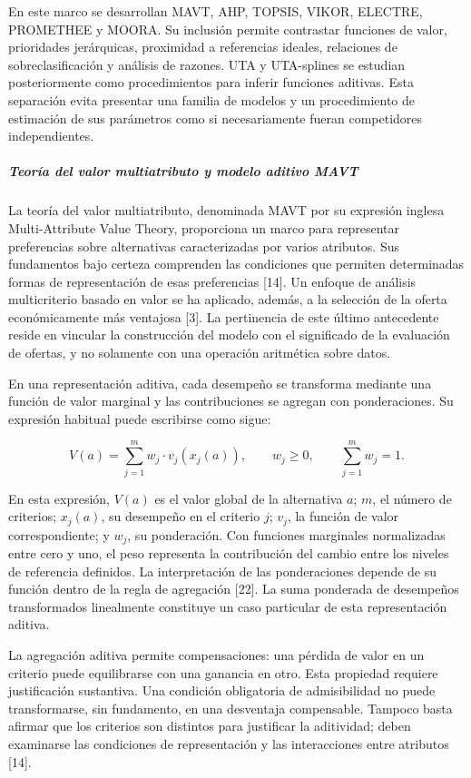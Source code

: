 \documentclass[12pt,a4paper]{article}
\begin{document}
En este marco se desarrollan MAVT, AHP, TOPSIS, VIKOR, ELECTRE, PROMETHEE y MOORA. Su inclusión permite contrastar funciones de valor, prioridades jerárquicas, proximidad a referencias ideales, relaciones de sobreclasificación y análisis de razones. UTA y UTA-splines se estudian posteriormente como procedimientos para inferir funciones aditivas. Esta separación evita presentar una familia de modelos y un procedimiento de estimación de sus parámetros como si necesariamente fueran competidores independientes.

\subparagraph{Teoría del valor multiatributo y modelo aditivo MAVT}

La teoría del valor multiatributo, denominada MAVT por su expresión inglesa Multi-Attribute Value Theory, proporciona un marco para representar preferencias sobre alternativas caracterizadas por varios atributos. Sus fundamentos bajo certeza comprenden las condiciones que permiten determinadas formas de representación de esas preferencias [14]. Un enfoque de análisis multicriterio basado en valor se ha aplicado, además, a la selección de la oferta económicamente más ventajosa [3]. La pertinencia de este último antecedente reside en vincular la construcción del modelo con el significado de la evaluación de ofertas, y no solamente con una operación aritmética sobre datos.

En una representación aditiva, cada desempeño se transforma mediante una función de valor marginal y las contribuciones se agregan con ponderaciones. Su expresión habitual puede escribirse como sigue:

\begin{equation}
V(a) = \sum_{j=1}^{m} w_j \cdot v_j(x_j(a)), \qquad w_j \geq 0, \qquad \sum_{j=1}^{m} w_j = 1.
\label{eq:mavt}
\end{equation}

En esta expresión, $V(a)$ es el valor global de la alternativa $a$; $m$, el número de criterios; $x_j(a)$, su desempeño en el criterio $j$; $v_j$, la función de valor correspondiente; y $w_j$, su ponderación. Con funciones marginales normalizadas entre cero y uno, el peso representa la contribución del cambio entre los niveles de referencia definidos. La interpretación de las ponderaciones depende de su función dentro de la regla de agregación [22]. La suma ponderada de desempeños transformados linealmente constituye un caso particular de esta representación aditiva.

La agregación aditiva permite compensaciones: una pérdida de valor en un criterio puede equilibrarse con una ganancia en otro. Esta propiedad requiere justificación sustantiva. Una condición obligatoria de admisibilidad no puede transformarse, sin fundamento, en una desventaja compensable. Tampoco basta afirmar que los criterios son distintos para justificar la aditividad; deben examinarse las condiciones de representación y las interacciones entre atributos [14].
\end{document}
